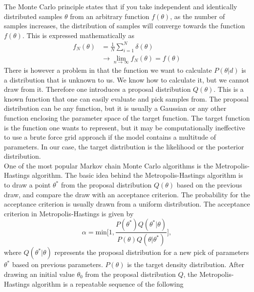 The Monte Carlo principle states that if you take
independent and identically distributed samples $\theta$ from an arbitrary
function $f(\theta)$, as the number of samples increases, the distribution of
samples will converge towards the function $f(\theta)$. This is expressed
mathematically as
\begin{align}
    f_N(\theta) &= \frac{1}{N}\sum_{i=1}^N\delta(\theta)\\
    &\rightarrow \lim_{n\to\infty}f_N(\theta)=f(\theta)
\end{align}
There is however a problem in that the function we want to calculate
$P(\theta\vert d)$ is a distribution that is unknown to us. We
know how to calculate it, but we cannot draw from it. Therefore one introduces a
proposal distribution $Q(\theta)$. This is a known function that one can easily
evaluate and pick samples from. The proposal distribution can be any function,
but it is usually a Gaussian or any other function enclosing the parameter space
of the target function. The target function is the function one wants to
represent, but it may be computationally ineffective to use a brute force grid
approach if the model contains a multitude of parameters. In our case, the
target distribution is the likelihood or the posterior distribution.\\\indent
One of the
most popular Markov chain Monte Carlo algorithms is the Metropolis-Hastings
algorithm. The basic idea behind the Metropolis-Hastings algorithm is to draw a
point $\theta^*$ from the proposal distribution $Q(\theta)$ based on the
previous draw, and compare the draw with an acceptance criterion. The probability for the acceptance criterion is usually drawn
from a uniform distribution. The acceptance criterion in
Metropolis-Hastings is given by
\begin{equation}\label{eq:acceptance}
    \alpha = \mathrm{min}\big[1, \frac{P(\theta^*)Q(\theta^*\vert \theta)}{P(\theta)Q(\theta\vert\theta^*)}\big],
\end{equation}
where $Q(\theta^*\vert\theta)$ represents the proposal distribution for a new
pick of parameters $\theta^*$ based on previous parameters. $P(\theta)$ is
the target density distribution. After
drawing an initial value $\theta_0$ from the proposal distribution $Q$, the
Metropolis-Hastings algorithm is a repeatable sequence of the following
